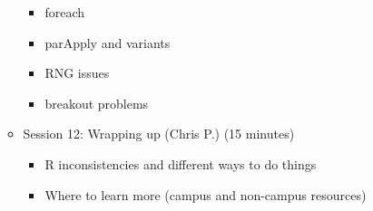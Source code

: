 \documentclass[12pt]{article}\usepackage{graphicx, color}
\begin{document}
\begin{itemize}
\begin{itemize}
\begin{itemize}
\item foreach
\item parApply and variants
\item RNG issues
\item breakout problems 
\end{itemize}
\item Session 12: Wrapping up (Chris P.) (15 minutes)

\begin{itemize}
\item R inconsistencies and different ways to do things 
\item Where to learn more (campus and non-campus resources)\end{itemize}
\end{itemize}
\end{itemize}
\end{document}
